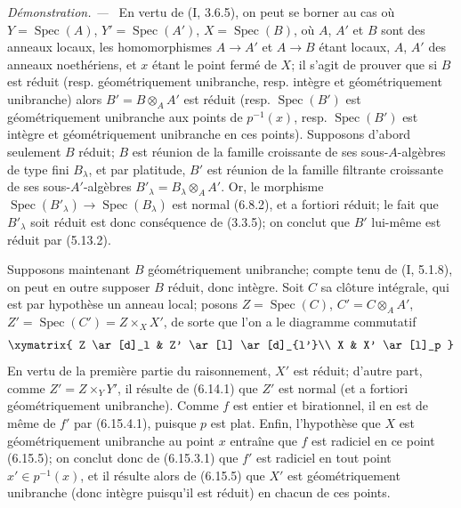 \documentclass[10pt,oneside]{book}
\newenvironment{proof}{%
  \par\medskip\noindent\textit{Démonstration. ---\ }}{\par}
\begin{document}
\begin{proof}
En vertu de (I, 3.6.5), on peut se borner au cas où
$Y=\operatorname{Spec}(A)$, $Y'=\operatorname{Spec}(A')$,
$X=\operatorname{Spec}(B)$, où $A$, $A'$ et $B$ sont des anneaux locaux,
les homomorphismes $A\to A'$ et $A\to B$ étant locaux, $A$, $A'$ des
anneaux noethériens, et $x$ étant le point fermé de $X$; il s'agit de
prouver que si $B$ est réduit (resp. géométriquement unibranche, resp.
intègre et géométriquement unibranche) alors $B'=B\otimes_A A'$ est réduit
(resp. $\operatorname{Spec}(B')$ est géométriquement unibranche aux points
de $p^{-1}(x)$, resp. $\operatorname{Spec}(B')$ est intègre et
géométriquement unibranche en ces points). Supposons d'abord seulement
$B$ réduit; $B$ est réunion de la famille croissante de ses
sous-$A$-algèbres de type fini $B_\lambda$, et par platitude, $B'$ est
réunion de la famille filtrante croissante de ses sous-$A'$-algèbres
$B'_\lambda=B_\lambda\otimes_A A'$. Or, le morphisme
$\operatorname{Spec}(B'_\lambda)\to\operatorname{Spec}(B_\lambda)$ est
normal (6.8.2), et a fortiori réduit; le fait que $B'_\lambda$ soit réduit
est donc conséquence de (3.3.5); on conclut que $B'$ lui-même est réduit par
(5.13.2).

Supposons maintenant $B$ géométriquement unibranche; compte tenu de (I,
5.1.8), on peut en outre supposer $B$ réduit, donc intègre. Soit $C$ sa
clôture intégrale, qui est par hypothèse un anneau local; posons
$Z=\operatorname{Spec}(C)$, $C'=C\otimes_A A'$,
$Z'=\operatorname{Spec}(C')=Z\times_X X'$, de sorte que l'on a le diagramme
commutatif
\[
\xymatrix{
Z \ar[d]_l & Z' \ar[l] \ar[d]_{l'}\\
X & X' \ar[l]_p
}
\]
En vertu de la première partie du raisonnement, $X'$ est réduit; d'autre
part, comme $Z'=Z\times_Y Y'$, il résulte de (6.14.1) que $Z'$ est normal
(et a fortiori géométriquement unibranche). Comme $f$ est entier et
birationnel, il en est de même de $f'$ par (6.15.4.1), puisque $p$ est
plat. Enfin, l'hypothèse que $X$ est géométriquement unibranche au point
$x$ entraîne que $f$ est radiciel en ce point (6.15.5); on conclut donc de
(6.15.3.1) que $f'$ est radiciel en tout point $x'\in p^{-1}(x)$, et il
résulte alors de (6.15.5) que $X'$ est géométriquement unibranche (donc
intègre puisqu'il est réduit) en chacun de ces points.
\end{proof}
\end{document}
